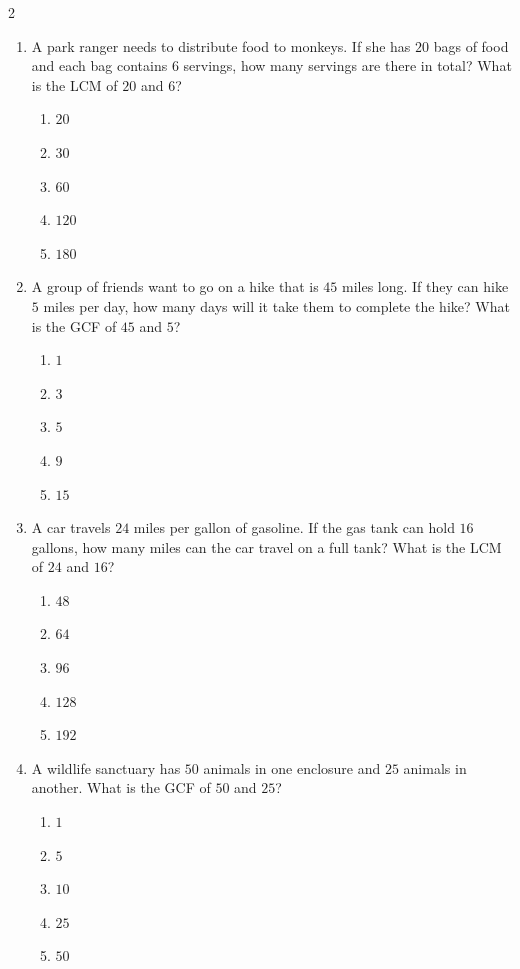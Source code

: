 \documentclass[10pt]{article}
\begin{document}
\begin{multicols}{2}
\begin{enumerate}[label=\textbf{Q\arabic*.}, leftmargin=*, itemsep=6pt, parsep=0pt]
  \item \small A park ranger needs to distribute food to monkeys. If she has $20$ bags of food and each bag contains $6$ servings, how many servings are there in total? What is the LCM of $20$ and $6$?
  \begin{enumerate}[label=(\Alph*), leftmargin=0.6cm, nosep, itemsep=2pt]
    \item $20$
    \item $30$
    \item $60$
    \item $120$
    \item $180$
  \end{enumerate}

  \item \small A group of friends want to go on a hike that is $45$ miles long. If they can hike $5$ miles per day, how many days will it take them to complete the hike? What is the GCF of $45$ and $5$?
  \begin{enumerate}[label=(\Alph*), leftmargin=0.6cm, nosep, itemsep=2pt]
    \item $1$
    \item $3$
    \item $5$
    \item $9$
    \item $15$
  \end{enumerate}

  \item \small A car travels $24$ miles per gallon of gasoline. If the gas tank can hold $16$ gallons, how many miles can the car travel on a full tank? What is the LCM of $24$ and $16$?
  \begin{enumerate}[label=(\Alph*), leftmargin=0.6cm, nosep, itemsep=2pt]
    \item $48$
    \item $64$
    \item $96$
    \item $128$
    \item $192$
  \end{enumerate}

  \item \small A wildlife sanctuary has $50$ animals in one enclosure and $25$ animals in another. What is the GCF of $50$ and $25$?
  \begin{enumerate}[label=(\Alph*), leftmargin=0.6cm, nosep, itemsep=2pt]
    \item $1$
    \item $5$
    \item $10$
    \item $25$
    \item $50$
  \end{enumerate}


\end{enumerate}
\end{multicols}
\end{document}
